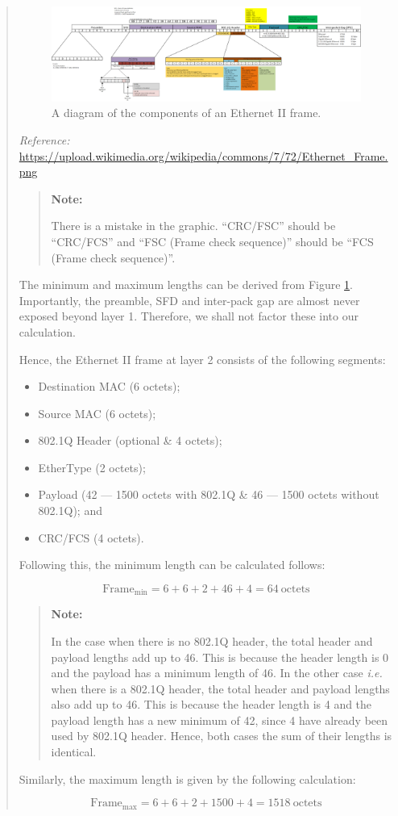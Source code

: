 \documentclass{article}
\newenvironment{ans}
   {\fbox{Answer}\begin{quote}\nopagebreak}
   {\end{quote}}
\newcommand\Refer[1]{
   \begin{center}
      {\small\textit{Reference:} \url{#1}}
   \end{center}
}%
\newcommand\ie{\emph{i.e.}}
\newenvironment{note}{%
    \begin{quote}
    \begin{tcolorbox}[colback=gray!10,arc=0mm,boxrule=0pt]
    \textbf{Note:}%
}{%
	\end{tcolorbox}
    \end{quote}%
}
\begin{document}
\begin{ans}
\begin{figure}[H]
\centering
\includegraphics[width=16cm]{data/q4.2-ethernet-diagram.png}
\caption{A diagram of the components of an Ethernet II frame.}
\label{fig:eth2-frame}
\end{figure}

\Refer{https://upload.wikimedia.org/wikipedia/commons/7/72/Ethernet_Frame.png}

\begin{note}
There is a mistake in the graphic. ``CRC/FSC'' should be
``CRC/FCS'' and ``FSC (Frame check sequence)'' should be ``FCS
(Frame check sequence)''.
\end{note}

The minimum and maximum lengths can be derived from Figure
\ref{fig:eth2-frame}. Importantly, the preamble, SFD and
inter-pack gap are almost never exposed beyond layer 1.
Therefore, we shall not factor these into our calculation.

Hence, the Ethernet II frame at layer 2 consists of the
following segments:

\begin{itemize}
\item Destination MAC (6 octets);
\item Source MAC (6 octets);
\item 802.1Q Header (optional \& 4 octets);
\item EtherType (2 octets);
\item Payload (42 --- 1500 octets with 802.1Q \& 46 --- 1500
      octets without 802.1Q); and
\item CRC/FCS (4 octets).
\end{itemize}

Following this, the minimum length can be calculated
follows:

$$
{\text{Frame}}_{\text{min}} = 6 + 6 + 2 + 46 + 4 = 64\ \text{octets}
$$

\begin{note}
In the case when there is no 802.1Q header, the total header and
payload lengths add up to 46. This is because the header length
is 0 and the payload has a minimum length of 46. In the other
case \ie{} when there is a 802.1Q header, the total header and
payload lengths also add up to 46. This is because the header
length is 4 and the payload length has a new minimum of 42,
since 4 have already been used by 802.1Q header. Hence, both
cases the sum of their lengths is identical.
\end{note}

Similarly, the maximum length is given by the following
calculation:

$$
{\text{Frame}}_{\text{max}} = 6 + 6 + 2 + 1500 + 4 = 1518\ \text{octets}
$$
\end{ans}
\end{document}

